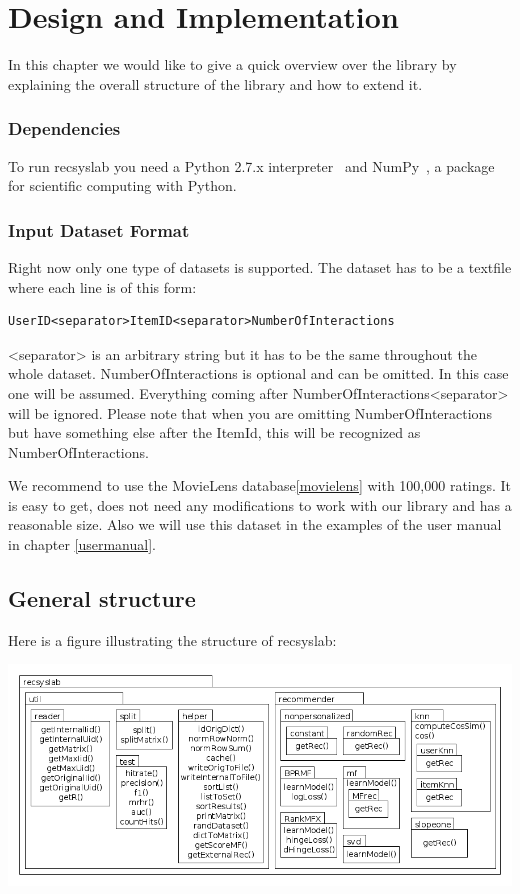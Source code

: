 
\chapter{Design and Implementation}
\label{design}
In this chapter we would like to give a quick overview over the library
by explaining the overall structure of the library and how to extend it.


\subsection*{Dependencies}
To run recsyslab you need a Python 2.7.x interpreter~\cite{python} and NumPy~\cite{numpy},
a package for scientific computing with Python.

\subsection*{Input Dataset Format}
Right now only one type of datasets is supported. The dataset has to be
a textfile where each line is of this form:
\begin{lstlisting}
UserID<separator>ItemID<separator>NumberOfInteractions
\end{lstlisting}
<separator> is an arbitrary string but it has to be the same throughout the whole dataset.
NumberOfInteractions is optional and can be omitted. In this case one will be assumed.
Everything coming after NumberOfInteractions<separator> will be ignored.
Please note that when you are omitting NumberOfInteractions but have something else after
the ItemId, this will be recognized as NumberOfInteractions.

We recommend to use the MovieLens database\ref{movielens} with 100,000 ratings.
It is easy to get, does not need any modifications to work with our library and has a
reasonable size. Also we will use this dataset in the examples of the user manual in 
chapter \ref{usermanual}.

%
\section{General structure}
Here is a figure illustrating the structure of recsyslab:

\includegraphics[scale=0.4]{packagediagram.png}

